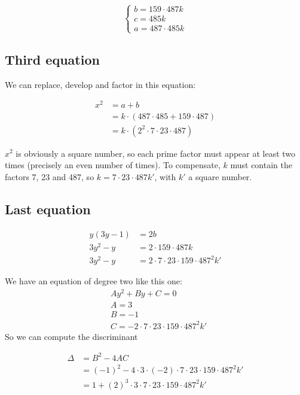 \documentclass[]{article}
\begin{document}
\begin{equation*}
    \begin{cases}
        b = 159 \cdot 487 k \\
        c = 485 k \\
        a = 487 \cdot 485 k
    \end{cases}
\end{equation*}

\subsection{Third equation}

We can replace, develop and factor in this equation:

\begin{align*}
    x^2 &= a + b \\
        &= k \cdot (487 \cdot 485 + 159 \cdot 487) \\
        &= k \cdot (2^2 \cdot 7 \cdot 23 \cdot 487)
\end{align*}

$x^2$ is obviously a square number, so each prime factor must appear at least two times (precisely an even number of times). To compensate, $k$ must contain the factors 7, 23 and 487, so $k = 7 \cdot 23 \cdot 487 k'$, with $k'$ a square number.

\subsection{Last equation}

\begin{align*}
    y (3y - 1)  &= 2b \\
    3y^2 - y    &= 2 \cdot 159 \cdot 487 k \\
    3y^2 - y    &= 2 \cdot 7 \cdot 23 \cdot 159 \cdot 487^2 k'
\end{align*}

We have an equation of degree two like this one:
\begin{align*}
    & Ay^2 + By + C = 0 \\
    & A = 3 \\
    & B = -1 \\
    & C = -2 \cdot 7 \cdot 23 \cdot 159 \cdot 487^2 k'
\end{align*}
So we can compute the discriminant

\begin{align*}
    \Delta  &= B^2 - 4 A C \\
            &= (-1)^2 - 4 \cdot 3 \cdot (-2) \cdot 7 \cdot 23 \cdot 159 \cdot 487^2 k' \\
            &= 1 + (2)^3 \cdot 3 \cdot 7 \cdot 23 \cdot 159 \cdot 487^2 k'\\
\end{align*}
\end{document}
